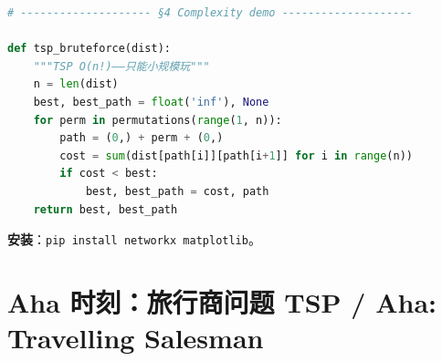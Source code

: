 \begin{lstlisting}[language=Python, caption={discrete.py 核心 API}]
# -------------------- §4 Complexity demo --------------------

def tsp_bruteforce(dist):
    """TSP O(n!)——只能小规模玩"""
    n = len(dist)
    best, best_path = float('inf'), None
    for perm in permutations(range(1, n)):
        path = (0,) + perm + (0,)
        cost = sum(dist[path[i]][path[i+1]] for i in range(n))
        if cost < best:
            best, best_path = cost, path
    return best, best_path
\end{lstlisting}

\textbf{安装}：\texttt{pip install networkx matplotlib}。

\section{Aha 时刻：旅行商问题 TSP / Aha: Travelling Salesman}


